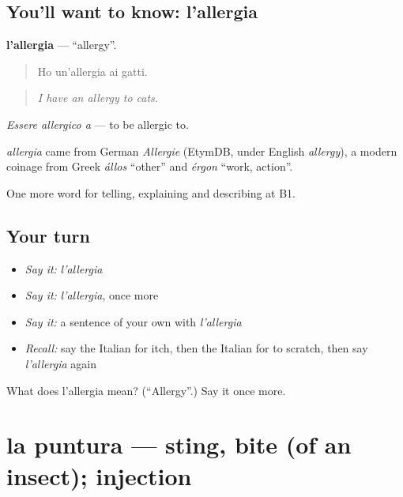 \subsection*{You'll want to know: l'allergia}
\textbf{l'allergia} — \textquotedblleft{}allergy\textquotedblright{}.

\begin{quote}
Ho un'allergia ai gatti.
\end{quote}

\begin{quote}
\emph{I have an allergy to cats.}
\end{quote}

\emph{Essere allergico a} — to be allergic to.

\begin{cousinweb}
\emph{allergia} came from German \emph{Allergie} (EtymDB, under English \emph{allergy}), a modern coinage from Greek \emph{állos} \textquotedblleft{}other\textquotedblright{} and \emph{érgon} \textquotedblleft{}work, action\textquotedblright{}.
\end{cousinweb}

\begin{grammarlens}[title={What you've built}]
One more word for telling, explaining and describing at B1.
\end{grammarlens}

\subsection*{Your turn}
\begin{itemize}
\raggedright
  \item \emph{Say it:} \emph{l'allergia}
  \item \emph{Say it:} \emph{l'allergia}, once more
  \item \emph{Say it:} a sentence of your own with \emph{l'allergia}
  \item \emph{Recall:} say the Italian for itch, then the Italian for to scratch, then say \emph{l'allergia} again
\end{itemize}

\begin{tcolorbox}[breakable,colback=teal!4,colframe=teal!35!black,title={Before you move on}]
What does l'allergia mean? (\textquotedblleft{}Allergy\textquotedblright{}.) Say it once more.
\end{tcolorbox}
\section[la puntura]{la puntura — sting, bite (of an insect); injection}

